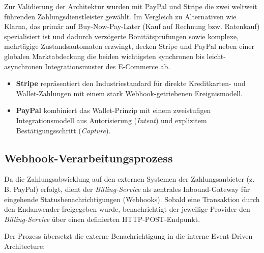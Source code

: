 \documentclass[
  11pt,
  a4paper,
  oneside,
  headings=normal,
  parskip=half,
  DIV=12
]{scrreprt}
\begin{document}
Zur Validierung der Architektur wurden mit PayPal und Stripe die zwei weltweit führenden Zahlungsdienstleister gewählt. Im Vergleich zu Alternativen wie Klarna, das primär auf Buy-Now-Pay-Later (Kauf auf Rechnung bzw. Ratenkauf) spezialisiert ist und dadurch verzögerte Bonitätsprüfungen sowie komplexe, mehrtägige Zustandsautomaten erzwingt, decken Stripe und PayPal neben einer globalen Marktabdeckung die beiden wichtigsten synchronen bis leicht-asynchronen Integrationsmuster des E-Commerce ab.

\begin{itemize}
    \item \textbf{Stripe} repräsentiert den Industriestandard für direkte Kreditkarten- und Wallet-Zahlungen mit einem stark Webhook-getriebenen Ereignismodell.

    \item \textbf{PayPal} kombiniert das Wallet-Prinzip mit einem zweistufigen Integrationsmodell aus Autorisierung (\textit{Intent}) und explizitem Bestätigungsschritt (\textit{Capture}).
\end{itemize}

\subsection{Webhook-Verarbeitungsprozess}

Da die Zahlungsabwicklung auf den externen Systemen der Zahlungsanbieter (z.\,B. PayPal) erfolgt, dient der \textit{Billing-Service} als zentrales Inbound-Gateway für eingehende Statusbenachrichtigungen (Webhooks). Sobald eine Transaktion durch den Endanwender freigegeben wurde, benachrichtigt der jeweilige Provider den \textit{Billing-Service} über einen definierten HTTP-POST-Endpunkt.

Der Prozess übersetzt die externe Benachrichtigung in die interne Event-Driven Architecture:
\end{document}
